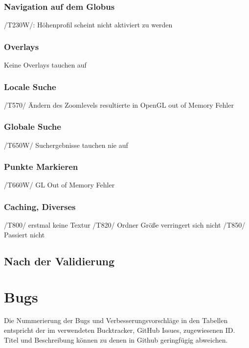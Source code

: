 \documentclass[10pt]{scrreprt}
\begin{document}
\subsection{Navigation auf dem Globus}
/T230W/: Höhenprofil scheint nicht aktiviert zu werden
\subsection{Overlays}
Keine Overlays tauchen auf
\subsection{Locale Suche}
/T570/ Ändern des Zoomlevels resultierte in OpenGL out of Memory Fehler
\subsection{Globale Suche}
/T650W/ Suchergebnisse tauchen nie auf
\subsection{Punkte Markieren}
/T660W/ GL Out of Memory Fehler
\subsection{Caching, Diverses}
/T800/ erstmal keine Textur
/T820/ Ordner Größe verringert sich nicht
/T850/ Passiert nicht

\section{Nach der Validierung}

\chapter{Bugs}
Die Nummerierung der Bugs und Verbesserungsvorschläge in den Tabellen entspricht der im verwendeten Bucktracker, GitHub Issues, zugewiesenen ID.
Titel und Beschreibung können zu denen in Github geringfügig abweichen.\\
\end{document}
